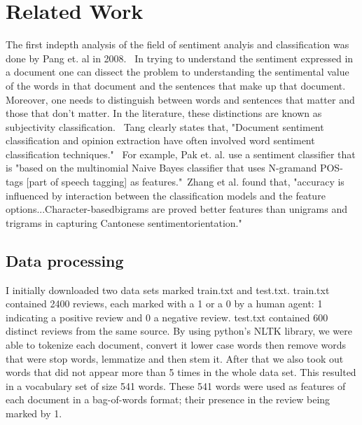 \documentclass{article} %
\begin{document}
\section{Related Work}
The first indepth analysis of the field of sentiment analyis and classification was done by Pang et. al in 2008.~\cite{Pang2008} In trying to understand the sentiment expressed in a document one can dissect the problem to understanding the sentimental value of the words in that document and the sentences that make up that document. Moreover, one needs to distinguish between words and sentences that matter and those that don't matter. In the literature, these distinctions are known as subjectivity classification.~\cite{Tang2009} Tang clearly states that, "Document sentiment classification and opinion extraction have often involved word sentiment classification techniques." ~\cite{Tang2009}For example, Pak et. al. use a sentiment classifier that is "based on the multinomial Naive Bayes classifier that uses N-gramand POS-tags [part of speech tagging] as features."~\cite{Pak2010}Zhang et al. found that, "accuracy is influenced by interaction between the classification models and the feature options...Character-basedbigrams are proved better features than unigrams and trigrams in capturing Cantonese sentimentorientation."~\cite{Zhang2011}

\subsection{Data processing}
I initially downloaded two data sets marked train.txt and test.txt. train.txt contained 2400 reviews, each marked with a 1 or a 0 by a human agent: 1 indicating a positive review and 0 a negative review. test.txt contained 600 distinct reviews from the same source. By using python's NLTK library, we were able to tokenize each document, convert it lower case words then remove words that were stop words, lemmatize and then stem it. After that we also took out words that did not appear more than 5 times in the whole data set. This resulted in a vocabulary set of size 541 words.  These 541 words were used as features of each document in a bag-of-words format; their presence in the review being marked by 1. 
\end{document}
